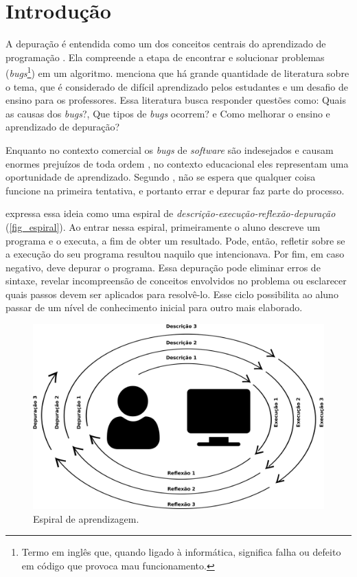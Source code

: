 \chapter{Introdução}
\label{c_introducao}

A depuração é entendida como um dos conceitos centrais do aprendizado de programação \cite{carver_assessing_1986}. Ela compreende a etapa de encontrar e solucionar problemas (\textit{bugs}\footnote{
    Termo em inglês que, quando ligado à informática, significa falha ou defeito em código que provoca mau funcionamento.
}) em um algoritmo.  menciona que há grande quantidade de literatura sobre o tema, que é considerado de difícil aprendizado pelos estudantes e um desafio de ensino para os professores. Essa literatura busca responder questões como: Quais as causas dos \textit{bugs}?, Que tipos de \textit{bugs} ocorrem? e Como melhorar o ensino e aprendizado de depuração?

Enquanto no contexto comercial os \textit{bugs} de \textit{software} são indesejados e causam enormes prejuízos de toda ordem \cite{valdivia-garcia_understanding_2016}, no contexto educacional eles representam uma oportunidade de aprendizado. Segundo , não se espera que qualquer coisa funcione na primeira tentativa, e portanto errar e depurar faz parte do processo. 

 expressa essa ideia como uma espiral de \textit{descrição-execução-reflexão-depuração} (\autoref{fig_espiral}). Ao entrar nessa espiral, primeiramente o aluno descreve um programa e o executa, a fim de obter um resultado. Pode, então, refletir sobre se a execução do seu programa resultou naquilo que intencionava. Por fim, em caso negativo, deve depurar o programa. Essa depuração pode eliminar erros de sintaxe, revelar incompreensão de conceitos envolvidos no problema ou esclarecer quais passos devem ser aplicados para resolvê-lo. Esse ciclo possibilita ao aluno passar de um nível de conhecimento inicial para outro mais elaborado.

\begin{figure}[!htpb]
  \centering
  \includegraphics[width=.6\linewidth,fbox]{figs/ciclo_descricao_execucao_reflexao_depuracao.png}
  \caption{Espiral de aprendizagem.}
  \label{fig_espiral}
\end{figure}

